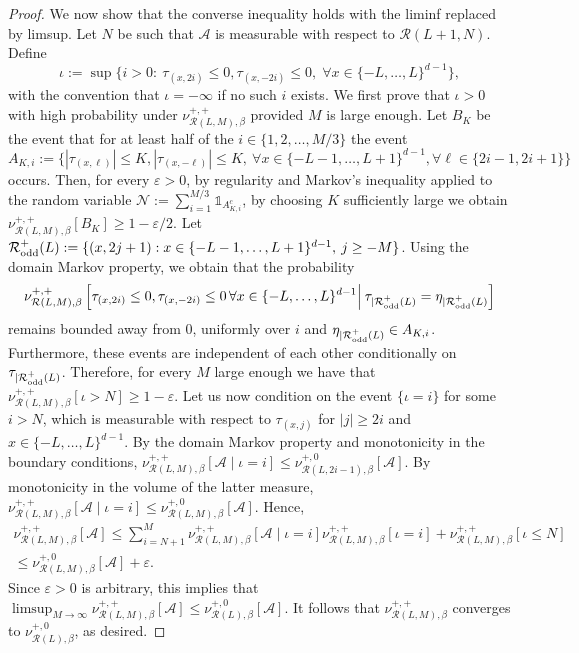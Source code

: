 \documentclass[11pt,a4paper]{article}
\numberwithin{equation}{section}
\theoremstyle{plain}
\theoremstyle{definition}
\begin{document}
\begin{proof}
We now show that the converse inequality holds with the liminf replaced by limsup. Let $N$ be such that $\mathcal{A}$ is measurable with respect to $\mathcal{R}(L+1,N)$. Define 
\begin{equation}
\iota := \sup \{i>0:~ \tau_{(x,2i)}\leq 0, \tau_{(x,-2i)}\leq 0, \; \forall x \in \{-L,\ldots, L \}^{d-1}\},
\end{equation}
with the convention that $\iota=-\infty$ if no such $i$ exists. We first prove that $\iota>0$ with high probability under $\nu^{+,+}_{\mathcal R(L,M),\beta}$ provided $M$ is large enough.
Let $B_K$ be the event that for at least half of the $i\in \{1,2,\ldots,M/3\}$ the event  
\begin{equation}
A_{K,i}:=\{|\tau_{(x,\ell)}|\leq K, |\tau_{(x,-\ell)}|\leq K ,\: \forall x\in \{-L-1,\ldots,L+1\}^{d-1}, \forall \ell \in \{2i-1,2i+1\} \}
\end{equation}
occurs. Then, for every $\varepsilon > 0$, by regularity and  Markov's inequality applied to the random variable $\mathcal{N}:=\sum_{i=1}^{M/3}\mathds{1}_{A_{K,i}^c}$, by choosing $K$ sufficiently large we obtain $\nu^{+,+}_{\mathcal{R}(L,M),\beta}[ B_K]\geq 1-\varepsilon/2$.
Let $\mathcal{R}^+_{\textup{odd}}(L):=\{(x,2j+1): x\in \{-L-1,\ldots,L+1\}^{d-1}, \: j\geq -M\}$. Using the domain Markov property, we obtain that the probability
\begin{equation}
\nu^{+,+}_{\mathcal{R}(L,M),\beta}\left[\tau_{(x,2i)}\leq 0, \tau_{(x,-2i)}\leq 0\, \forall x\in \{-L,\ldots,L\}^{d-1} \Big |\: \tau_{|\mathcal{R}^+_{\textup{odd}}(L)}=\eta_{|\mathcal{R}^+_{\textup{odd}}(L)} \right]
\end{equation}
remains bounded away from $0$, uniformly over $i$ and $\eta_{|\mathcal{R}^+_{\textup{odd}}(L)}\in A_{K,i}$. Furthermore, these events are independent of each other conditionally on $\tau_{|\mathcal{R}^+_{\textup{odd}}(L)}$. Therefore, for every $M$ large enough we have that $\nu^{+,+}_{\mathcal{R}(L,M),\beta}[\iota> N]\geq 1-\varepsilon$. Let us now condition on the event $\{\iota = i\}$ for some $i>N$, which is measurable with respect to $\tau_{(x,j)}$ for $|j|\geq 2i$ and $x \in \{-L,\ldots,L\}^{d-1}$. By the domain Markov property and monotonicity in the boundary conditions, $\nu^{+,+}_{\mathcal{R}(L,M),\beta}[\mathcal A \mid \iota=i]\leq \nu^{+,0}_{\mathcal{R}(L,2i-1),\beta}[\mathcal A]$. By monotonicity in the volume of the latter measure, $\nu^{+,+}_{\mathcal{R}(L,M),\beta}[\mathcal A \mid \iota=i]\leq \nu^{+,0}_{\mathcal{R}(L,M),\beta}[\mathcal A]$. Hence,
\begin{multline}
\nu^{+,+}_{\mathcal{R}(L,M),\beta}[\mathcal A]\leq \sum_{i=N+1}^M \nu^{+,+}_{\mathcal{R}(L,M),\beta}[\mathcal A \mid \iota=i]\nu^{+,+}_{\mathcal{R}(L,M),\beta}[\iota=i]+\nu^{+,+}_{\mathcal{R}(L,M),\beta}[\iota\leq N]\\\leq \nu^{+,0}_{\mathcal{R}(L,M),\beta}[\mathcal A]+\varepsilon. 
\end{multline}
Since $\varepsilon>0$ is arbitrary, this implies that $\limsup_{M\to\infty} \nu^{+,+}_{\mathcal{R}(L,M),\beta}[\mathcal A]\leq \nu^{+,0}_{\mathcal{R}(L),\beta}[\mathcal A]$. It follows that $\nu^{+,+}_{\mathcal{R}(L,M),\beta}$ converges to $\nu^{+,0}_{\mathcal{R}(L),\beta}$, as desired.


\end{proof}
\end{document}
